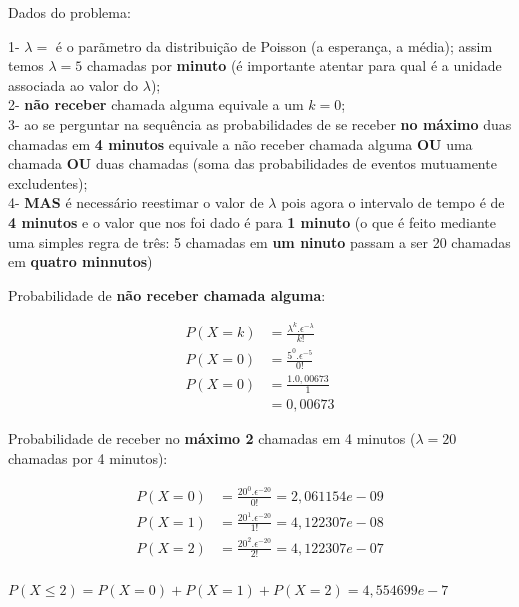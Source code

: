 \documentclass[
]{book}
\begin{document}
\hfill\break

Dados do problema:

1- \(\lambda=\) é o parãmetro da distribuição de Poisson (a esperança, a média); assim temos \(\lambda=5\) chamadas por \textbf{minuto} (é importante atentar para qual é a unidade associada ao valor do \(\lambda\));\\
2- \textbf{não receber} chamada alguma equivale a um \(k=0\);\\
3- ao se perguntar na sequência as probabilidades de se receber \textbf{no máximo} duas chamadas em \textbf{4 minutos} equivale a não receber chamada alguma \textbf{OU} uma chamada \textbf{OU} duas chamadas (soma das probabilidades de eventos mutuamente excludentes);\\
4- \textbf{MAS} é necessário reestimar o valor de \(\lambda\) pois agora o intervalo de tempo é de \textbf{4 minutos} e o valor que nos foi dado é para \textbf{1 minuto} (o que é feito mediante uma simples regra de três: 5 chamadas em \textbf{um ninuto} passam a ser 20 chamadas em \textbf{quatro minnutos})

\hfill\break

Probabilidade de \textbf{não receber chamada alguma}:

\hfill\break

\begin{align*}
P(X=k) & = \frac{\lambda ^{k}. \epsilon^{-\lambda}} {k!} \\
P(X=0) & = \frac{5^{0}. \epsilon^{-5}} {0!} \\
P(X=0) & = \frac{1 . 0,00673}{1}\\
       & = 0,00673
\end{align*}

\hfill\break

Probabilidade de receber no \textbf{máximo 2} chamadas em 4 minutos (\(\lambda = 20\) chamadas por 4 minutos):

\hfill\break

\begin{align*}
P(X=0) & = \frac{20^{0}. \epsilon^{-20}} {0!} = 2,061154e-09 \\
P(X=1) & = \frac{20^{1}. \epsilon^{-20}} {1!} = 4,122307e-08 \\
P(X=2) & = \frac{20^{2}. \epsilon^{-20}} {2!} = 4,122307e-07 \\
\end{align*}

\(P(X \leq 2)=P(X=0)+P(X=1)+P(X=2)=4,554699e-7\)

\hfill\break
\end{document}
